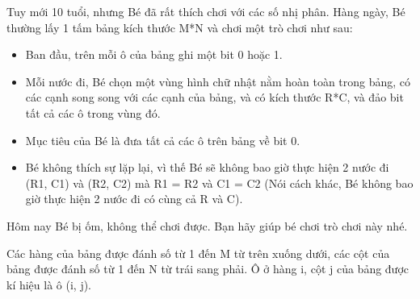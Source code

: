 Tuy mới 10 tuổi, nhưng Bé đã rất thích chơi với các số nhị phân. Hàng ngày, Bé thường lấy 1 tấm bảng kích thước M*N và chơi một trò chơi như sau:  
\begin{itemize}
	\item     Ban đầu, trên mỗi ô của bảng ghi một bit 0 hoặc 1.   
	\item     Mỗi nước đi, Bé chọn một vùng hình chữ nhật nằm hoàn toàn trong bảng, có các cạnh song song với các cạnh của bảng, và có kích thước R*C, và đảo bit tất cả các ô trong vùng đó.   
	\item     Mục tiêu của Bé là đưa tất cả các ô trên bảng về bit 0.   
	\item     Bé không thích sự lặp lại, vì thế Bé sẽ không bao giờ thực hiện 2 nước đi (R1, C1) và (R2, C2) mà R1 = R2 và C1 = C2 (Nói cách khác, Bé không bao giờ thực hiện 2 nước đi có cùng cả R và C).   
\end{itemize}

   Hôm nay Bé bị ốm, không thể chơi được. Bạn hãy giúp bé chơi trò chơi này nhé.  

   Các hàng của bảng được đánh số từ 1 đến M từ trên xuống dưới, các cột của bảng được đánh số từ 1 đến N từ trái sang phải. Ô ở hàng i, cột j của bảng được kí hiệu là ô (i, j).